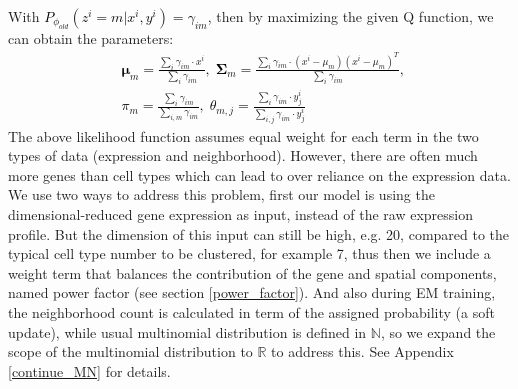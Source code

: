 With \textcolor{black}{$P_{\phi_{old}}(z^i=m|x^i,y^i) = \gamma_{im}$}, then by maximizing the given Q function, we can obtain the parameters:
\textcolor{black}{
\begin{equation}
\label{max_step}
\begin{split}
    &\boldsymbol{\mu}_m = \frac{\sum_i{\gamma_{im}\cdot x^i}}{\sum_{i}{\gamma_{im}}},\;
    \boldsymbol{\Sigma}_m = \frac{\sum_i{\gamma_{im}\cdot (x^i-\mu_m)(x^i-\mu_m)^T}}{\sum_{i}{\gamma_{im}}},\;\\
    &\pi_m = \frac{\sum_i{\gamma_{im}}}{\sum_{i,m}{\gamma_{im}}},\;
    \theta_{m,j} = \frac{\sum_i{\gamma_{im}\cdot y_j^i}}{\sum_{i,j }{\gamma_{im}\cdot y_j^i}}
\end{split}
\end{equation}
}
The above likelihood function assumes equal weight for each term in the two types of data (expression and neighborhood). However, there are often much more genes than cell types which can lead to over reliance on the expression data. We use two ways to address this problem, first our model is using the dimensional-reduced gene expression as input, instead of the raw expression profile. But the dimension of this input can still be high, e.g. 20, compared to the typical cell type number to be clustered, for example 7, thus then we include a weight term that balances the contribution of the gene and spatial components, named power factor (see section \ref{power_factor}). And also during EM training, the neighborhood count is calculated in term of the assigned probability (a soft update), while usual multinomial distribution is defined in $\mathbb{N}$, so we expand the scope of the multinomial distribution to $\mathbb{R}$ to address this. See Appendix \ref{continue_MN} for details.

